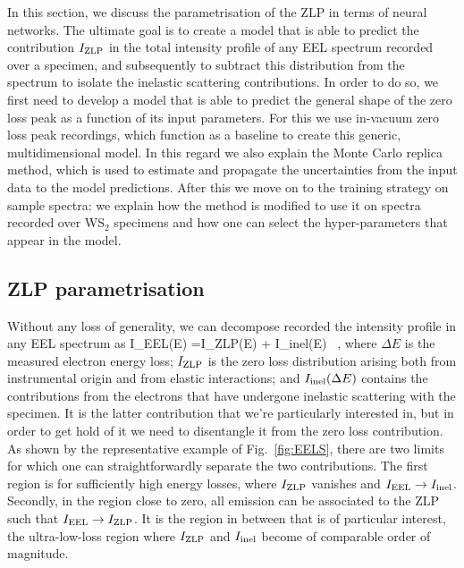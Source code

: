 In this section, we discuss the parametrisation of the ZLP in terms of neural networks.
%
The ultimate goal is to create a model that is able to predict the contribution $I_{\rm ZLP}$
in the total intensity profile of any EEL spectrum recorded over a specimen, 
and subsequently to subtract this distribution from the spectrum to isolate the inelastic
scattering contributions.
%
In order to do so, we first need to develop a model that is able to predict the general
shape of the zero loss peak as a function of its input parameters. 
%
For this we use in-vacuum zero loss peak recordings, which function as a baseline to 
create this generic, multidimensional model.
%
In this regard we also
explain the Monte Carlo replica method, which is used to estimate and propagate the
uncertainties from the input data to the model predictions.
%
After this we move on to the training strategy on sample spectra: 
we explain how the method is modified to use it on spectra recorded over
WS$_2$ specimens and how one can select the hyper-parameters that appear in the model.


\subsection{ZLP parametrisation}
\label{sec:parametrisation}

Without any loss of generality, we can decompose recorded the intensity profile
in any EEL spectrum as
\be
\label{eq:IeelTot}
I_{\rm EEL}(\Delta E) =I_{\rm ZLP}(\Delta E) + I_{\rm inel}(\Delta E) \, ,
\ee
where $\Delta E$ is the measured electron energy loss; $I_{\rm ZLP}$ is the zero loss
distribution arising both from instrumental origin and from elastic interactions; and
$I_{\rm inel}(\Delta E)$ contains the contributions from the electrons that have undergone
inelastic scattering with the specimen. 
%
It is the latter contribution that we're particularly interested in, but in order 
to get hold of it we need to disentangle it from the zero loss contribution.
%
As shown by the representative example of Fig.~\ref{fig:EELS}, there are two limits
for which one can straightforwardly separate the two contributions.
%
The first region is for sufficiently high energy losses, where
$I_{\rm ZLP}$ vanishes and $I_{\rm EEL} \to I_{\rm inel}$.
%
Secondly, in the region close to zero, all emission can be associated to
the ZLP such that $I_{\rm EEL}\to  I_{\rm ZLP}$.
%
It is the region in between that is of particular interest, 
the ultra-low-loss region where $I_{\rm ZLP}$ and $I_{\rm inel}$
become of comparable order of magnitude.

